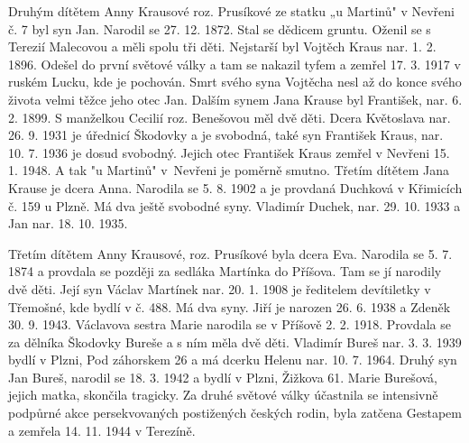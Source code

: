\documentclass[../dejiny-rodu-prusiku.tex]{subfiles}
\begin{document}
Druhým dítětem Anny Krausové roz. Prusíkové ze statku „u Martinů" v Nevřeni č. 7 byl syn Jan. Narodil se 27. 12. 1872. Stal se dědicem gruntu. Oženil se s Tere­zií Malecovou a měli spolu tři děti. Nejstarší byl Vojtěch Kraus nar. 1. 2. 1896. Odešel do první světové války a tam se nakazil tyfem a zemřel 17. 3. 1917 v ruském Lucku, kde je pochován. Smrt svého syna Vojtěcha nesl až do konce svého života velmi těžce jeho otec Jan. Dalším synem Jana Krause byl František, nar. 6. 2. 1899. S manželkou Cecilií roz. Benešovou měl dvě děti. Dcera Květoslava nar. 26. 9. 1931 je úřednicí Ško­dovky a je svobodná, také syn František Kraus, nar. 10. 7. 1936 je dosud svobodný. Jejich otec František Kraus zemřel v Nevřeni 15. 1. 1948. A tak "u Martinů" v Nevřeni je poměrně smutno. Třetím dítětem Jana Krause je dcera Anna. Narodila se 5. 8. 1902 a je provdaná Duchková v Křimicích č. 159 u Plzně. Má dva ještě svobodné syny. Vladimír Duchek, nar. 29. 10. 1933 a Jan nar. 18. 10. 1935.

Třetím dítětem Anny Krausové, roz. Prusíkové byla dce­ra Eva. Narodila se 5. 7. 1874 a provdala se později za sedláka Martínka do Příšova. Tam se jí narodily dvě děti. Její syn Václav Martínek nar. 20. 1. 1908 je ředitelem devítiletky v Třemošné, kde bydlí v č. 488. Má dva syny. Jiří je narozen 26. 6. 1938 a Zdeněk 30. 9. 1943. Václavova sestra Marie narodila se v Příšově 2. 2. 1918. Provdala se za dělníka Škodovky Bureše a s ním měla dvě děti. Vladimír Bureš nar. 3. 3. 1939 bydlí v Plzni, Pod záhorskem 26 a má dcerku Helenu nar. 10. 7. 1964. Druhý syn Jan Bureš, narodil se 18. 3. 1942 a bydlí v Plzni, Žižkova 61. Marie Burešová, jejich matka, skončila tragicky. Za druhé svě­tové války  účastnila se intensivně podpůrné akce persekvovaných postižených českých rodin, byla zatčena Gestapem a zemřela 14. 11. 1944 v Terezíně.
\end{document}
